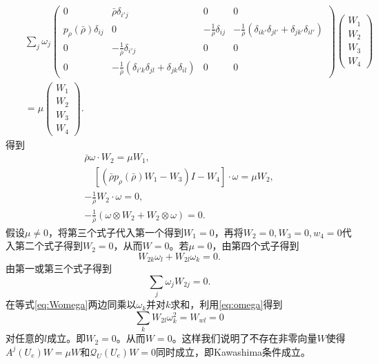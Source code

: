 \documentclass{article}
\begin{document}
	\begin{eqnarray*}
		&& \sum_j \omega_j \left( \begin{array}{cccc} 
 		0 & \bar{\rho} \delta_{i'j} & 0 & 0 \\
 		p_{\rho}(\bar{\rho}) \delta_{ij} & 0 & -\frac{1}{\bar{\rho}}\delta_{ij} & -\frac{1}{\bar{\rho}}(\delta_{ik'} \delta_{jl'}+\delta_{jk'}\delta_{il'}) \\
 		0 & -\frac{1}{\bar{\rho}} \delta_{i'j} & 0 & 0 \\
 		0 & - \frac{1}{\bar{\rho}}(\delta_{i'k} \delta_{jl} + \delta_{jk} \delta_{il}) & 0 & 0 
 		\end{array}\right) \left( \begin{array}{c} W_1 \\ W_2 \\W_3 \\W_4 \end{array} \right) \\
 		&& = \mu \left( \begin{array}{c} W_1 \\ W_2 \\W_3 \\W_4 \end{array} \right).
	\end{eqnarray*}
	得到
	\begin{eqnarray*}
		\bar{\rho} \omega \cdot W_2 = \mu W_1, \\ \quad [(\bar{\rho} p_{\rho}(\bar{\rho}) W_1 - W_3) I - W_4] \cdot \omega =\mu W_2, \\
		-\frac{1}{\bar{\rho}} W_2 \cdot \omega  = 0, \\
		-\frac{1}{\bar{\rho}} (\omega \otimes W_2 + W_2 \otimes \omega) = 0.
	\end{eqnarray*}
	假设$\mu \neq 0$，将第三个式子代入第一个得到$W_1 = 0$，再将$W_2=0,W_3=0,w_4=0$代入第二个式子得到$W_2 = 0$，从而$W = 0$。若$\mu = 0$，由第四个式子得到
	\begin{equation*} \label{eq:Womega}
		W_{2k} \omega_l + W_{2l} \omega_k = 0.
	\end{equation*}
	由第一或第三个式子得到
	\begin{equation}\label{eq:omega}
		\sum_{j} \omega_j W_{2j} = 0.
	\end{equation}
	在等式\eqref{eq:Womega}两边同乘以$\omega_k$并对$k$求和，利用\eqref{eq:omega}得到
	\begin{equation*}
		\sum_{k} W_{2l} \omega_k^2 = W_{wl} = 0
	\end{equation*}
	对任意的$l$成立。即$W_2=0$。从而$W=0$。这样我们说明了不存在非零向量$W$使得$A^j(U_e) W= \mu W $和$\mathcal{Q}_U(U_e) W=0$同时成立，即Kawashima条件成立。
\end{document}
